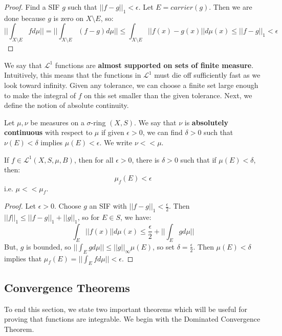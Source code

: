 	\begin{proof}
		Find a SIF $g$ such that $||f - g||_1 < \epsilon$. Let $E = carrier(g)$. Then we are done because $g$ is zero on 
		$X\setminus E$, so:
		$$
			||\int_{X\setminus E} fd\mu|| = ||\int_{X\setminus E} (f - g)d\mu|| \leq \int_{X\setminus E} ||f(x) - g(x)||d\mu(x)
			\leq ||f - g||_1 < \epsilon
		$$
	\end{proof}
	
	We say that $\mathcal L^1$ functions are \textbf{almost supported on sets of finite measure}. Intuitively, this means that 
	the functions in $\mathcal L^1$ must die off sufficiently fast as we look toward infinity. Given any tolerance, we can 
	choose a finite set large enough to make the integral of $f$ on this set smaller than the given tolerance. Next, 
	we define the notion of absolute continuity.
	
	\begin{definition}
		Let $\mu, \nu$ be measures on a $\sigma$-ring $(X, S)$. We say that $\nu$ is \textbf{absolutely continuous} with 
		respect to $\mu$ if given $\epsilon > 0$, we can find $\delta > 0$ such that $\nu(E) < \delta$ implies $\mu(E) < 
		\epsilon$. We write $\nu << \mu$. 
	\end{definition}
	
	\begin{prop}
		If $f\in\mathcal L^1(X, S, \mu, B)$, then for all $\epsilon > 0$, there is $\delta > 0$ such that if $\mu(E) < \delta$, 
		then:
		$$
			\mu_f(E) < \epsilon
		$$
		i.e. $\mu << \mu_f$. 
	\end{prop}
	
	\begin{proof}
		Let $\epsilon > 0$. Choose $g$ an SIF with $||f - g||_1 < \frac{\epsilon}{2}$. Then $||f||_1\leq ||f - g||_1 + ||g||_1$, 
		so for $E\in S$, we have:
		$$
			\int_E ||f(x)||d\mu(x)\leq\frac{\epsilon}{2} + ||\int_E gd\mu||
		$$
		But, $g$ is bounded, so $||\int_E gd\mu|| \leq ||g||_\infty\mu(E)$, so set $\delta = \frac{\epsilon}{2}$. Then $\mu(E) 
		< \delta$ implies that $\mu_f(E) = ||\int_E fd\mu|| < \epsilon$.
	\end{proof}
	
	\subsection{Convergence Theorems}
	
	To end this section, we state two important theorems which will be useful for proving that functions are integrable. We 
	begin with the Dominated Convergence Theorem.
	
